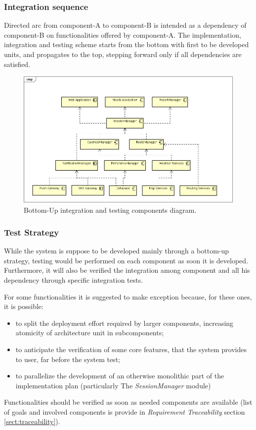 \subsubsection{Integration sequence}

Directed arc from component-A to component-B is intended as a dependency of component-B on functionalities offered by component-A.
The implementation, integration and testing scheme starts from the bottom with first to be developed units, and propagates to the top, stepping forward only if all dependencies are satisfied.

\begin{figure}
	\centering
	\includegraphics{Images/IntegrationDiagram.png}
	\caption{\label{fig:integration} Bottom-Up integration and testing components diagram. }
\end{figure}

\clearpage %

\subsubsection{Test Strategy}
\label{testplan}

While the system is suppose to be developed mainly through a bottom-up strategy, testing would be performed on each component as soon it is developed. Furthermore, it will also be verified the integration among component and all his dependency through specific integration tests. 

For some functionalities it is suggested to make exception because, for these ones, it is possible:

\begin{itemize}
	\item to split the deployment effort required by larger components, increasing atomicity of architecture unit in subcomponents;
	\item to anticipate the verification of some core features, that the system provides to user, far before the system test;
	\item to parallelize the development of an otherwise monolithic part of the implementation plan (particularly The \textit{SessionManager} module)
\end{itemize}

Functionalities should be verified as soon as needed components are available (list of goals and involved components is provide in \textit{Requirement Traceability} section \ref{sect:traceability}).